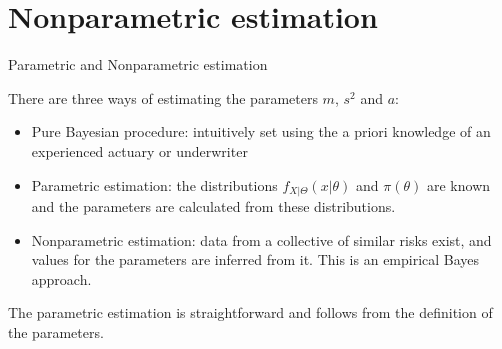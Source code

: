 \documentclass[11pt]{beamer}
\begin{document}
\section{Nonparametric estimation}
\begin{frame}{Parametric  and  Nonparametric estimation}

There are three ways of estimating the parameters $m$, $s^2$ and $a$:
\begin{itemize}
\item \alert{Pure Bayesian procedure}: intuitively set using the a priori knowledge of an experienced actuary or underwriter
\item \alert{Parametric estimation}: the distributions $f_{X|\Theta}(x|\theta)$ and $\pi(\theta)$ are known and the parameters are calculated from these distributions.
\item \alert{Nonparametric estimation}: data from a collective of similar risks exist, and values for the parameters are inferred from it. This is an empirical Bayes approach.
\end{itemize}
The parametric estimation is straightforward and follows from the definition of the parameters.

\end{frame}
\end{document}
